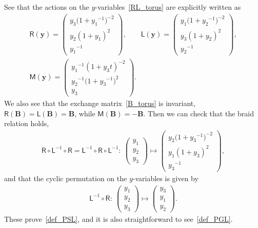 \documentclass[pdftex]{sigma}
\numberwithin{equation}{section}
\begin{document}
See that the actions on the $y$-variables~\eqref{RL_torus} are explicitly written as
\begin{gather*}
 \mathsf{R}(\boldsymbol{y}) = \begin{pmatrix}
 y_3 \big( 1+{y_1}^{-1} \big)^{-2} \\
 y_2 ( 1+{y_1} )^{2} \\
 {y_1}^{-1}
 \end{pmatrix},
 \qquad
 \mathsf{L}(\boldsymbol{y}) = \begin{pmatrix}
 y_1 \big( 1+ {y_2}^{-1} \big)^{-2} \\
 y_3 ( 1+y_2 )^2 \\
 {y_2}^{-1}
 \end{pmatrix} , \\
 \mathsf{M}(\boldsymbol{y}) = \begin{pmatrix}
 {y_1}^{-1} (1+y_3t)^{-2} \\
 {y_2}^{-1} \big( 1+ {y_3}^{-1} \big)^2 \\
 y_3
 \end{pmatrix} .
\end{gather*}
We also see that the exchange matrix~\eqref{B_torus} is invariant, $\mathsf{R}(\mathbf{B}) =\mathsf{L}(\mathbf{B})=\mathbf{B}$, while $\mathsf{M}(\mathbf{B})= - \mathbf{B}$. Then we can check that the braid relation holds,
\begin{gather*}
 \mathsf{R} \circ \mathsf{L}^{-1} \circ \mathsf{R} = \mathsf{L}^{-1} \circ \mathsf{R} \circ \mathsf{L}^{-1}\colon \ \begin{pmatrix}
 y_1 \\ y_2 \\ y_3
 \end{pmatrix}
 \mapsto
 \begin{pmatrix}
 y_2 \big( 1+{y_3}^{-1} \big)^{-2} \\
 y_1 ( 1+y_3 )^2 \\
 {y_3}^{-1}
 \end{pmatrix} ,
\end{gather*}
and that the cyclic permutation on the $y$-variables is given by
\begin{gather*}
 \mathsf{L}^{-1} \circ \mathsf{R}\colon \
 \begin{pmatrix}
 y_1 \\ y_2 \\ y_3
 \end{pmatrix}
 \mapsto
 \begin{pmatrix}
 y_3 \\ y_1 \\ y_2
 \end{pmatrix} .
\end{gather*}
These prove~\eqref{def_PSL}, and it is also straightforward to see~\eqref{def_PGL}.
\end{document}
